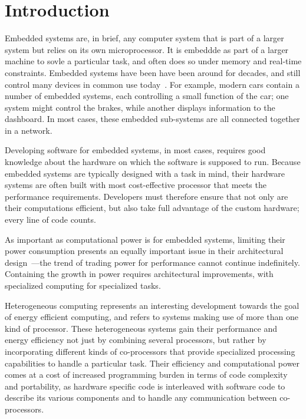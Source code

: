 \documentclass[../paper.tex]{subfiles}
\begin{document}
\chapter{Introduction}
\label{intro}

Embedded systems are, in brief, any computer system that is part of a larger system but relies on its own microprocessor. It is embeddde as part of a larger machine to sovle a particular task, and often does so under memory and real-time constraints. Embedded systems have been have been around for decades, and still control many devices in common use today~\cite{barr2006}. For example, modern cars contain a number of embedded systems, each controlling a small function of the car; one system might control the brakes, while another displays information to the dashboard. In most cases, these embedded sub-systems are all connected together in a network. 

Developing software for embedded systems, in most cases, requires good knowledge about the hardware on which the software is supposed to run. Because embedded systems are typically designed with a task in mind, their hardware systems are often built with most cost-effective processor that meets the performance requirements. Developers must therefore ensure that not only are their computations efficient, but also take full advantage of the custom hardware; every line of code counts.

As important as computational power is for embedded systems, limiting their power consumption presents an equally important issue in their architectural design~\cite{mudge2001}---the trend of trading power for performance cannot continue indefinitely. Containing the growth in power requires architectural improvements, with specialized computing for specialized tasks.

Heterogeneous computing represents an interesting development towards the goal of energy efficient computing, and refers to systems making use of more than one kind of processor. These heterogeneous systems gain their performance and energy efficiency not just by combining several processors, but rather by incorporating different kinds of co-processors that provide specialized processing capabilities to handle a particular task. Their efficiency and computational power comes at a cost of increased programming burden in terms of code complexity and portability, as hardware specific code is interleaved with software code to describe its various components and to handle any communication between co-processors.
\end{document}
